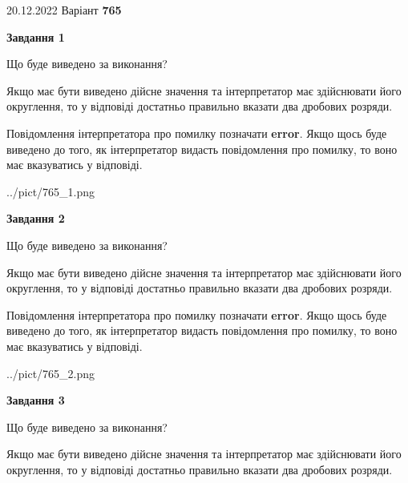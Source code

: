 \documentclass[12pt, ukrainian]{article}
\begin{document}
{20.12.2022 Варіант \No \textbf { 765 }\par}
{
\begin {Large}

{\begin {center}\textbf{Завдання 1}\end {center}}\par
Що буде виведено за виконання? \par

Якщо має бути виведено дійсне значення та інтерпретатор має здійснювати його округлення, 
то у відповіді достатньо правильно вказати два дробових розряди.

Повідомлення інтерпретатора про помилку позначати \textbf{error}.
Якщо щось буде виведено до того, як інтерпретатор видасть повідомлення про помилку, 
то воно має вказуватись у відповіді. \par

\begin{center}
	{../pict/765_1.png}
\end{center}
\newpage

{\begin {center}\textbf{Завдання 2}\end {center}}\par
Що буде виведено за виконання? \par

Якщо має бути виведено дійсне значення та інтерпретатор має здійснювати його округлення, 
то у відповіді достатньо правильно вказати два дробових розряди.

Повідомлення інтерпретатора про помилку позначати \textbf{error}.
Якщо щось буде виведено до того, як інтерпретатор видасть повідомлення про помилку, 
то воно має вказуватись у відповіді. \par

\begin{center}
	{../pict/765_2.png}
\end{center}
\newpage

{\begin {center}\textbf{Завдання 3}\end {center}}\par
Що буде виведено за виконання? \par

Якщо має бути виведено дійсне значення та інтерпретатор має здійснювати його округлення, 
то у відповіді достатньо правильно вказати два дробових розряди.


\end{Large}}
\end{document}
